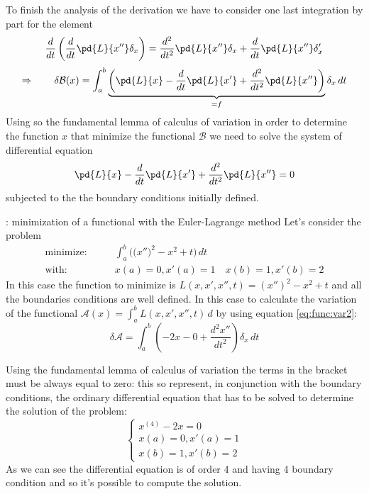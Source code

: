 To finish the analysis of the derivation we have to consider one last integration by part for the element
\[ \frac{d}{dt} \left( \frac{d}{dt} \pd{L }{x''} \delta_x \right) = \frac{d^2}{dt^2} \pd{L }{x''} \delta_x + \frac{d}{dt} \pd{L }{x''} \delta_x' \]
\begin{equation} \label{eq:func:var2}
	\Rightarrow \qquad \delta\mathcal B(x) = \int_a^b \underbrace{\left( \pd{L }{x} - \frac d {dt} \pd{L }{x'} + \frac{d^2}{dt^2} \pd{L }{x''} \right)}_{=f} \delta_x\, dt
\end{equation}
Using so the fundamental lemma of calculus of variation in order to determine the function $x$ that minimize the functional $\mathcal B$ we need to solve the system of differential equation
\[   \pd{L }{x} - \frac d {dt} \pd{L }{x'} + \frac{d^2}{dt^2} \pd{L }{x''} = 0  \]
subjected to the the boundary conditions initially defined.		

\begin{example}{: minimization of a functional with the Euler-Lagrange  method} \label{es:func:eullagmeth}
	Let's consider the problem 
	\begin{align*}
		\textrm{minimize:}& \qquad \int_a^b \Big( \big(x''\big)^2 - x^2 + t \Big)\,dt \\
		\textrm{with:}& \qquad x(a) = 0, x'(a) = 1 \quad x(b) = 1, x'(b) = 2
	\end{align*}
	In this case the function to minimize is $L (x,x',x'',t) = (x'')^2 - x^2+t$ and all the boundaries conditions are well defined. In this case to calculate the variation of the functional $\mathcal A(x) = \int_a^b L (x,x',x'',t)\, d$ by using equation \ref{eq:func:var2}:
	\[ \delta \mathcal A = \int_a^b \left( -2x - 0 + \frac{d^2x''}{dt^2} \right) \delta_x\, dt \]
	
	Using the fundamental lemma of calculus of variation the terms in the bracket must be always equal to zero: this so represent, in conjunction with the boundary conditions, the ordinary differential equation that has to be solved to determine the solution of the problem:
	\[ \begin{cases}
		x^{(4)} - 2x = 0 \\
		x(a) = 0, x'(a) = 1 \\ x(b) = 1, x'(b) = 2
	\end{cases} \]	
	As we can see the differential equation is of order 4 and having 4 boundary condition and so it's possible to compute the solution.
\end{example}

